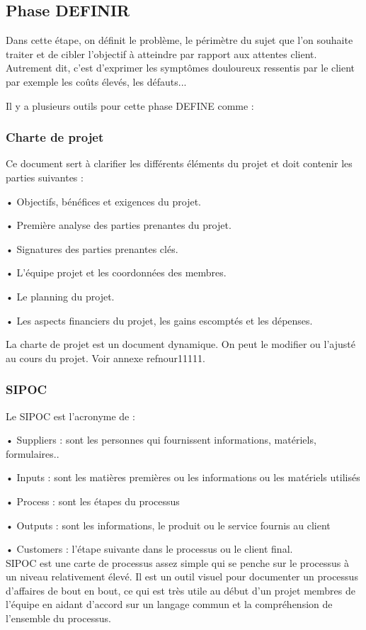 \documentclass[12pt, a4paper]{thesis}
\begin{document}
\subsection{Phase DEFINIR}
Dans cette étape, on définit le problème, le périmètre du sujet que l'on souhaite traiter et de cibler l'objectif à atteindre par rapport aux attentes client. Autrement dit, c'est d'exprimer les symptômes douloureux ressentis par le client par exemple les coûts élevés, les défauts...

Il y a plusieurs outils pour cette phase DEFINE comme :

\subsubsection{Charte de projet}

Ce document sert à clarifier les différents éléments du projet et doit contenir les parties suivantes :

• Objectifs, bénéfices et exigences du projet.

• Première analyse des parties prenantes du projet.

• Signatures des parties prenantes clés.

• L'équipe projet et les coordonnées des membres.

• Le planning du projet.

• Les aspects financiers du projet, les gains escomptés et les dépenses.

La charte de projet est un document dynamique. On peut le modifier ou l'ajusté au cours du projet. Voir annexe ref{nour11111}.
\subsubsection{SIPOC}
Le SIPOC est l'acronyme de :
\item • Suppliers : sont les personnes qui fournissent informations, matériels, formulaires.. 
\item • Inputs : sont les matières premières ou les informations ou les matériels utilisés
\item • Process : sont les étapes du processus
\item • Outputs : sont les informations, le produit ou le service fournis au client
\item • Customers : l’étape suivante dans le processus ou le client final.\\
SIPOC est une carte de processus assez simple qui se penche sur le processus à un niveau relativement élevé. Il est un outil visuel pour documenter un processus d'affaires de bout en bout, ce qui est très utile au début d'un projet membres de l'équipe en aidant d'accord sur un langage commun et la compréhension de l'ensemble du processus.
\end{document}
